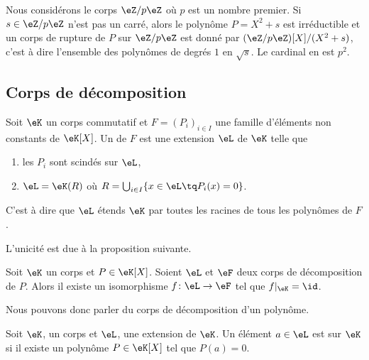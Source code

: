 \begin{example}
    Nous considérons le corps \( \eZ/p\eZ\) où \( p\) est un nombre premier. Si \( s\in \eZ/p\eZ\) n'est pas un carré, alors le polynôme \(P= X^2+s\) est irréductible et un corps de rupture de \( P\) sur \( \eZ/p\eZ\) est donné par \( (\eZ/p\eZ)[X]/(X^2+s)\), c'est à dire l'ensemble des polynômes de degrés \( 1\) en \( \sqrt{s}\). Le cardinal en est \( p^2\).
\end{example}

\subsection{Corps de décomposition}

\begin{definition}
    Soit \( \eK\) un corps commutatif et \( F=(P_i)_{i\in I}\) une famille d'éléments non constants de \( \eK[X]\). Un  de \( F\) est une extension \( \eL\) de \( \eK\) telle que
    \begin{enumerate}
        \item
            les \( P_i\) sont scindés sur \( \eL\),
        \item
            \( \eL=\eK(R)\) où \( R=\bigcup_{i\in I}\{ x\in\eL\tq P_i(x)=0 \}\).
    \end{enumerate}
    C'est à dire que \( \eL\) étends \( \eK\) par toutes les racines de tous les polynômes de \( F\).
\end{definition}

L'unicité est due à la proposition suivante.
\begin{proposition}     \label{PropTMkfyM}
    Soit \( \eK\) un corps et \( P\in\eK[X]\). Soient \( \eL\) et \( \eF\) deux corps de décomposition de \( P\). Alors il existe un isomorphisme \( f\colon \eL\to \eF\) tel que \( f|_{\eK}=\id\).
\end{proposition}
Nous pouvons donc parler du corps de décomposition d'un polynôme.

Soit \( \eK\), un corps et \( \eL\), une extension de \( \eK\). Un élément \( a\in \eL\) est  sur \( \eK\) si il existe un polynôme \( P\in \eK[X]\) tel que \( P(a)=0\).

